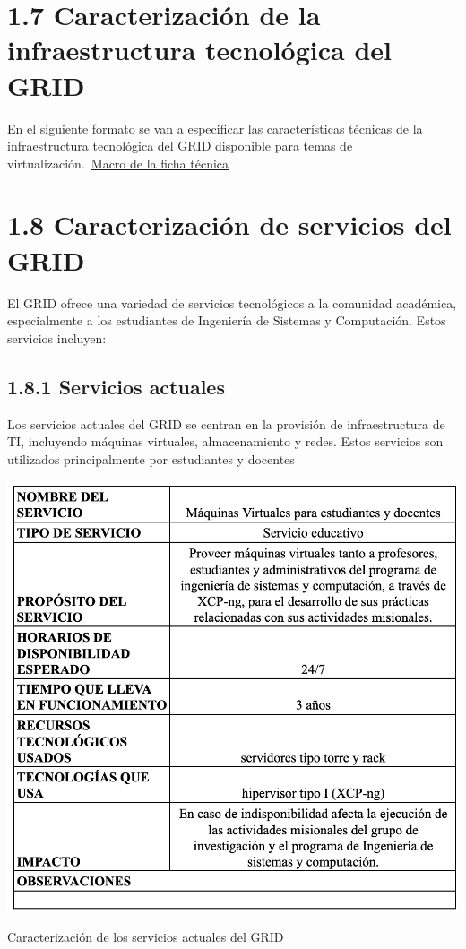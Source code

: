 \section*{1.7 Caracterización de la infraestructura tecnológica del GRID}
En el siguiente formato se van a especificar las características técnicas de la infraestructura tecnológica del GRID disponible para temas de virtualización.\ \href{https://docs.google.com/spreadsheets/d/14NBv72ucVTrLqGIldYdIsjdBGt3QlgwcblcVRis-DaQ/edit?usp=sharing}{Macro de la ficha técnica}


\section*{1.8 Caracterización de servicios del GRID}
El GRID ofrece una variedad de servicios tecnológicos a la comunidad académica, especialmente a los estudiantes de Ingeniería de Sistemas y Computación. Estos servicios incluyen:

\subsection*{1.8.1 Servicios actuales}
Los servicios actuales del GRID se centran en la provisión de infraestructura de TI, incluyendo máquinas virtuales, almacenamiento y redes. Estos servicios son utilizados principalmente por estudiantes y docentes

\begin{table}[H]
    \centering
    \includegraphics[width=\textwidth]{tablas-images/cp1/servicios-actuales/servicios-actuales.png}
    \caption{Caracterización de los servicios actuales del GRID}
    \label{tab:servicios-actuales}
\end{table}

